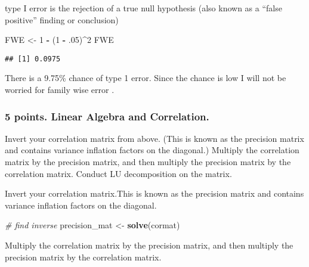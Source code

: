 \documentclass[]{article}
\newenvironment{Shaded}{\begin{snugshade}}{\end{snugshade}}
\newcommand{\KeywordTok}[1]{\textcolor[rgb]{0.13,0.29,0.53}{\textbf{#1}}}
\newcommand{\DecValTok}[1]{\textcolor[rgb]{0.00,0.00,0.81}{#1}}
\newcommand{\StringTok}[1]{\textcolor[rgb]{0.31,0.60,0.02}{#1}}
\newcommand{\CommentTok}[1]{\textcolor[rgb]{0.56,0.35,0.01}{\textit{#1}}}
\newcommand{\OperatorTok}[1]{\textcolor[rgb]{0.81,0.36,0.00}{\textbf{#1}}}
\newcommand{\NormalTok}[1]{#1}
\begin{document}
type I error is the rejection of a true null hypothesis (also known as a
``false positive'' finding or conclusion)

\begin{Shaded}
\begin{Highlighting}[]
\NormalTok{FWE <-}\StringTok{ }\DecValTok{1} \OperatorTok{-}\StringTok{ }\NormalTok{(}\DecValTok{1} \OperatorTok{-}\StringTok{ }\NormalTok{.}\DecValTok{05}\NormalTok{)}\OperatorTok{^}\DecValTok{2} 
\NormalTok{FWE}
\end{Highlighting}
\end{Shaded}

\begin{verbatim}
## [1] 0.0975
\end{verbatim}

There is a 9.75\% chance of type 1 error. Since the chance is low I will
not be worried for family wise error .

\subsubsection{5 points. Linear Algebra and
Correlation.}\label{points.-linear-algebra-and-correlation.}

Invert your correlation matrix from above. (This is known as the
precision matrix and contains variance inflation factors on the
diagonal.) Multiply the correlation matrix by the precision matrix, and
then multiply the precision matrix by the correlation matrix. Conduct LU
decomposition on the matrix.

Invert your correlation matrix.This is known as the precision matrix and
contains variance inflation factors on the diagonal.

\begin{Shaded}
\begin{Highlighting}[]
\CommentTok{# find inverse}
\NormalTok{precision_mat <-}\StringTok{ }\KeywordTok{solve}\NormalTok{(cormat)}
\end{Highlighting}
\end{Shaded}

Multiply the correlation matrix by the precision matrix, and then
multiply the precision matrix by the correlation matrix.

\begin{Shaded}
\end{Shaded}
\end{document}
